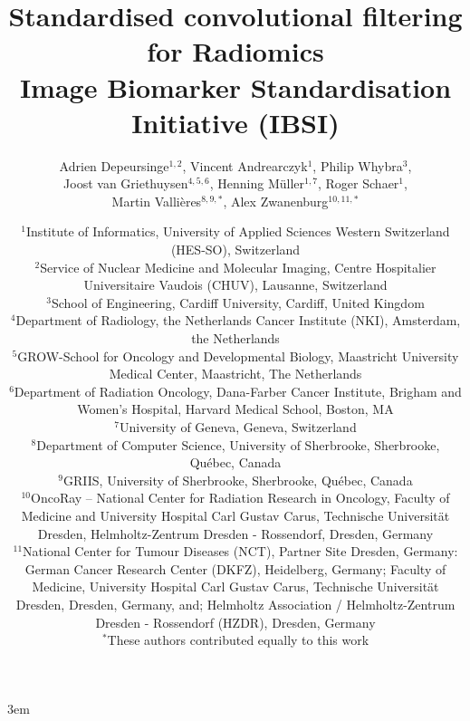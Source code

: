 \documentclass[fleqn,a4paper,oneside,openany]{book}
\begin{document}
\emergencystretch 3em
\renewcommand{\tablename}{Table}

\frontmatter
\title{Standardised convolutional filtering for Radiomics\\
\vspace{2mm}
\large Image Biomarker Standardisation Initiative (IBSI) \\
\vspace{10mm}}
\author{Adrien Depeursinge$^{1,2}$, 
Vincent Andrearczyk$^1$, 
Philip Whybra$^3$,\\
Joost van Griethuysen$^{4,5,6}$,
Henning M\"{u}ller$^{1,7}$, 
Roger Schaer$^1$,\\
Martin Valli\`{e}res$^{8,9,*}$,
Alex Zwanenburg$^{10,11,*}$}
\date{
\small
$^1$Institute of Informatics, University of Applied Sciences Western Switzerland (HES-SO), Switzerland\\
$^2$Service of Nuclear Medicine and Molecular Imaging, Centre Hospitalier Universitaire Vaudois (CHUV), Lausanne, Switzerland\\
$^3$School of Engineering, Cardiff University, Cardiff, United Kingdom\\
$^4$Department of Radiology, the Netherlands Cancer Institute (NKI), Amsterdam, the Netherlands\\
$^5$GROW-School for Oncology and Developmental Biology, Maastricht University Medical Center, Maastricht, The Netherlands\\
$^6$Department of Radiation Oncology, Dana-Farber Cancer Institute, Brigham and Women’s Hospital, Harvard Medical School, Boston, MA\\
$^{7}$University of Geneva, Geneva, Switzerland\\
$^8$Department of Computer Science, University of Sherbrooke, Sherbrooke, Qu\'{e}bec, Canada\\
$^9$GRIIS, University of Sherbrooke, Sherbrooke, Qu\'{e}bec, Canada\\
$^{10}$OncoRay -- National Center for Radiation Research in Oncology, Faculty of Medicine and University Hospital Carl Gustav Carus, Technische Universität Dresden, Helmholtz-Zentrum Dresden - Rossendorf, Dresden, Germany\\
$^{11}$National Center for Tumour Diseases (NCT), Partner Site Dresden, Germany: German Cancer Research Center (DKFZ), Heidelberg, Germany; Faculty of Medicine, University Hospital Carl Gustav Carus, Technische Universität Dresden, Dresden, Germany, and; Helmholtz Association / Helmholtz-Zentrum Dresden - Rossendorf (HZDR), Dresden, Germany\\
\vspace{5mm}
$^{*}$These authors contributed equally to this work\\
\vspace{10mm}
\large
}
\maketitle
\end{document}
